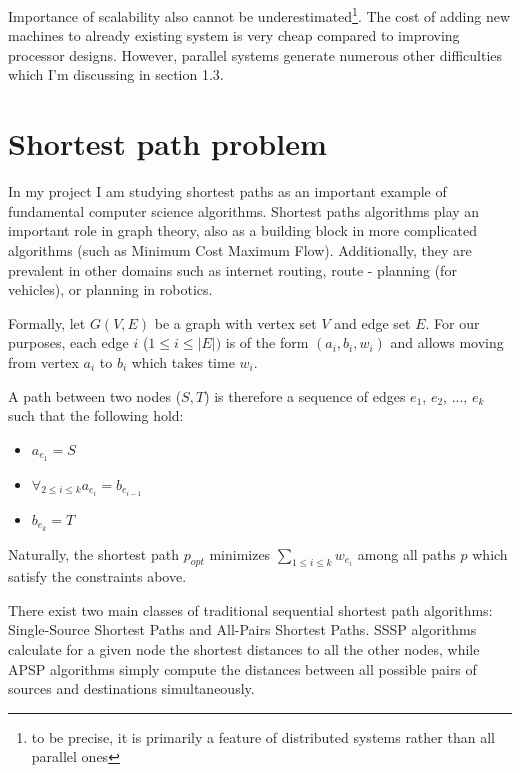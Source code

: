 \documentclass[12pt,a4paper,twoside,openright]{report}
\begin{document}
Importance of scalability also cannot be underestimated\footnote{to be precise, it is primarily a feature of distributed systems rather than all parallel ones}. The cost of adding new machines to already existing system is very cheap compared to improving processor designs. 
However, parallel systems generate numerous other difficulties which I'm discussing in section 1.3.

\section{Shortest path problem}
In my project I am studying shortest paths as an important example of fundamental computer science algorithms. Shortest paths algorithms play an important role in graph theory, also as a building block in more complicated algorithms (such as Minimum Cost Maximum Flow). Additionally, they are prevalent in other domains such as internet routing, route - planning (for vehicles), or planning in robotics. 

Formally, let $G(V,E)$ be a graph with vertex set $V$ and edge set $E$. For our purposes, each edge $i$ ($1\leq i\leq |E|)$ is of the form $(a_i, b_i, w_i)$ and allows moving from vertex $a_i$ to $b_i$ which takes time $w_i$. 

A path between two nodes ($S, T$) is therefore a sequence of edges $e_1$, $e_2$, ..., $e_k$ such that the following hold:
\begin{itemize}
    \item $a_{e_1} = S$
    \item $\displaystyle\mathop{\forall}_{2\leq i \leq k} a_{e_{i}} = b_{e_{i-1}}$
    \item $b_{e_k} = T$
\end{itemize}

Naturally, the shortest path $p_{opt}$ minimizes $\displaystyle\mathop{\sum}_{1\leq i \leq k} w_{e_i}$ among all paths $p$ which satisfy the constraints above.

There exist two main classes of traditional sequential shortest path algorithms: Single-Source Shortest Paths and All-Pairs Shortest Paths. SSSP algorithms calculate for a given node the shortest distances to all the other nodes, while APSP algorithms simply compute the distances between all possible pairs of sources and destinations simultaneously.
\end{document}
